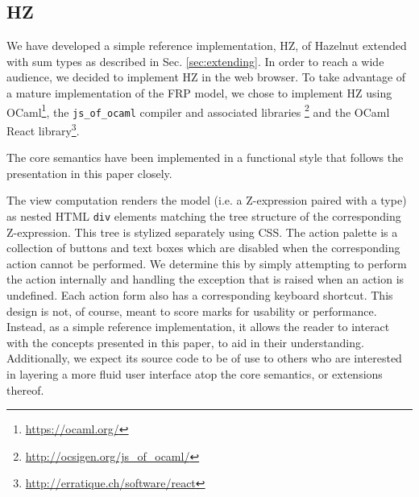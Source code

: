 \subsection{HZ}
We have developed a simple reference implementation, HZ, of Hazelnut extended with sum types as described in Sec. \ref{sec:extending}.  In
order to reach a wide audience, we decided to implement HZ in the web
browser.  To take advantage of a mature implementation of the FRP
model, we chose to implement HZ using
OCaml\footnote{\url{https://ocaml.org/}}, the \texttt{js\_of\_ocaml}
compiler and associated libraries
\cite{DBLP:conf/ml/Balat06}\footnote{\url{http://ocsigen.org/js\_of\_ocaml/}}
and the OCaml React
library\footnote{\url{http://erratique.ch/software/react}}.

The core semantics have
been implemented in a functional style that follows the presentation in this paper closely.

The view computation renders the model (i.e. a Z-expression paired with a type) as nested HTML \texttt{div} elements matching the tree structure of the corresponding Z-expression. This tree is stylized separately using CSS. The action palette is a collection of buttons and text boxes which
are disabled when the corresponding action cannot be performed. We determine this by simply attempting to perform the
action internally and handling the exception that is raised when an action
is undefined. Each action form also has a corresponding keyboard shortcut. This design is not, of course, meant to score marks for
usability or performance. Instead, as a simple reference implementation, it allows the reader to interact with the concepts presented in this paper, to aid in their understanding.  Additionally, we expect its source code to be of use to others who are interested in
layering a more fluid user interface atop the core semantics, or extensions thereof. 

